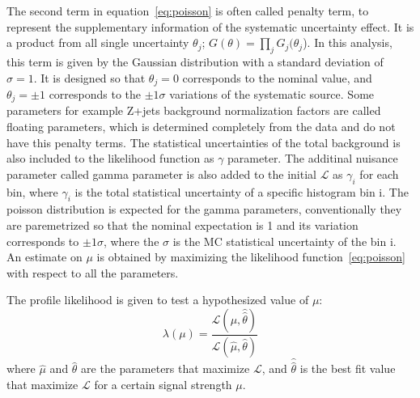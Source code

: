The second term in equation~\ref{eq:poisson} is often called penalty term, to represent the supplementary information of the systematic uncertainty effect. It is a product from all single uncertainty $\theta_j$; $G(\theta) = \prod_{j}G_{j}(\theta_{j}$). 
In this analysis, this term is given by the Gaussian distribution with a standard deviation of $\sigma = 1$. It is designed so that $\theta_j = 0$ corresponds to the nominal value, and $\theta_j = \pm 1$ corresponds to the $\pm 1 \sigma$ variations of the systematic source. 
Some parameters for example Z+jets background normalization factors are called floating parameters, which is determined completely from the data and do not have this penalty terms.
The statistical uncertainties of the total background is also included to the likelihood function as $\gamma$ parameter. 
The additinal nuisance parameter called gamma parameter is also added to the initial $\mathcal{L}$ as $\gamma_i$ for each bin, where $\gamma_i$ is the total statistical uncertainty of a specific histogram bin i. 
The poisson distribution is expected for the gamma parameters, conventionally they are paremetrized so that the nominal expectation is 1 and its variation corresponds to $\pm 1 \sigma$, where the $\sigma$ is the MC statistical uncertainty of the bin i.
An estimate on $\mu$ is obtained by maximizing the likelihood function~\ref{eq:poisson} with respect to all the parameters.  

The profile likelihood is given to test a hypothesized value of $\mu$:
\begin{equation}
\lambda(\mu) = \frac{\mathcal{L}\left(\mu, \hat{\hat{\theta}}\right)}{\mathcal{L}(\hat{\mu}, \hat{\theta})}
\end{equation}
where $\hat{\mu}$ and $\hat{\theta}$ are the parameters that maximize $\mathcal{L}$, and $\hat{\hat{\theta}}$ is the best fit value that maximize $\mathcal{L}$ for a certain signal strength $\mu$.

